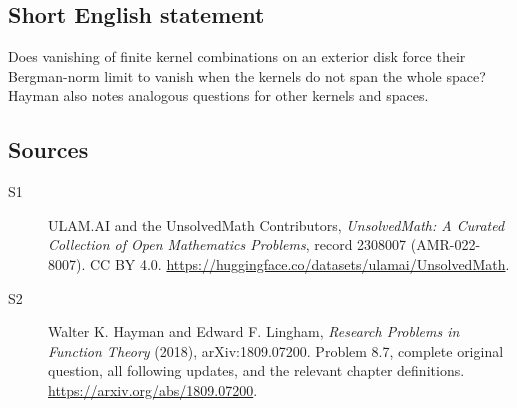 \documentclass[11pt]{book}
\begin{document}
\subsection{Short English statement}
Does vanishing of finite kernel combinations on an exterior disk force their Bergman-norm limit to vanish when the kernels do not span the whole space? Hayman also notes analogous questions for other kernels and spaces.
\subsection{Sources}
\begin{description}
\item[\hypertarget{source:2308007:1}{S1}] ULAM.AI and the UnsolvedMath Contributors, \emph{UnsolvedMath: A Curated Collection of Open Mathematics Problems}, record 2308007 (AMR-022-8007). CC BY 4.0. \url{https://huggingface.co/datasets/ulamai/UnsolvedMath}.
\item[\hypertarget{source:2308007:2}{S2}] Walter K. Hayman and Edward F. Lingham, \emph{Research Problems in Function Theory} (2018), arXiv:1809.07200. Problem 8.7, complete original question, all following updates, and the relevant chapter definitions. \url{https://arxiv.org/abs/1809.07200}.
\end{description}
\label{end:2308007}
\end{document}
